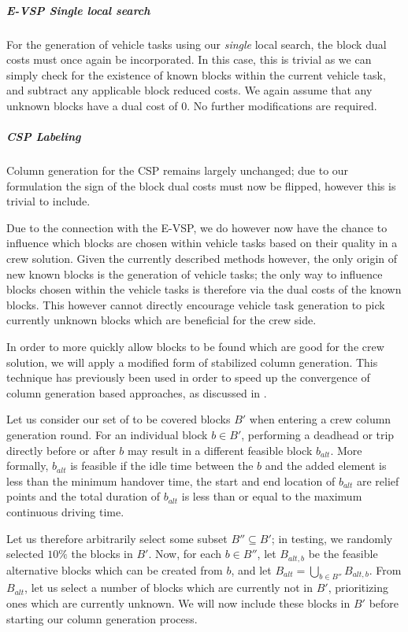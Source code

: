 \documentclass[]{article}
\begin{document}
\subparagraph{E-VSP Single local search} For the generation of vehicle tasks using our \textit{single} local search, the block dual costs must once again be incorporated. In this case, this is trivial as we can simply check for the existence of known blocks within the current vehicle task, and subtract any applicable block reduced costs. We again assume that any unknown blocks have a dual cost of 0. No further modifications are required.

\subparagraph{CSP Labeling} Column generation for the CSP remains largely unchanged; due to our formulation the sign of the block dual costs must now be flipped, however this is trivial to include. 

Due to the connection with the E-VSP, we do however now have the chance to influence which blocks are chosen within vehicle tasks based on their quality in a crew solution. Given the currently described methods however, the only origin of new known blocks is the generation of vehicle tasks; the only way to influence blocks chosen within the vehicle tasks is therefore via the dual costs of the known blocks. This however cannot directly encourage vehicle task generation to pick currently unknown blocks which are beneficial for the crew side. 

In order to more quickly allow blocks to be found which are good for the crew solution, we will apply a modified form of stabilized column generation. This technique has previously been used in order to speed up the convergence of column generation based approaches, as discussed in \citet{DuMerle1999}. 

Let us consider our set of to be covered blocks $B'$ when entering a crew column generation round. For an individual block $b \in B'$, performing a deadhead or trip directly before or after $b$ may result in a different feasible block $b_{alt}$. More formally, $b_{alt}$ is feasible if the idle time between the $b$ and the added element is less than the minimum handover time, the start and end location of $b_{alt}$ are relief points and the total duration of $b_{alt}$ is less than or equal to the maximum continuous driving time.

Let us therefore arbitrarily select some subset $B'' \subseteq B'$; in testing, we randomly selected $10\%$ the blocks in $B'$. Now, for each $b \in B''$, let $B_{alt,b}$ be the feasible alternative blocks which can be created from $b$, and let $B_{alt} = \bigcup_{b \in B''} B_{alt,b}$. From $B_{alt}$, let us select a number of blocks which are currently not in $B'$, prioritizing ones which are currently unknown. We will now include these blocks in $B'$ before starting our column generation process.
\end{document}
